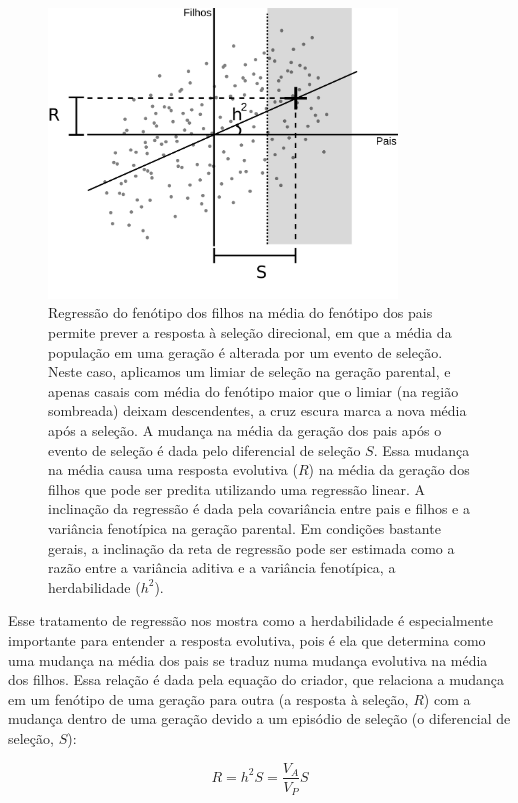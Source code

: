 \begin{refsection}
\begin{figure}
    \centering
    \includegraphics[width=350px]{parent-offspring.png}
    \caption[Regressão pais e filhos]{Regressão do fenótipo dos filhos na média 
    do fenótipo dos pais permite prever a resposta à seleção direcional, em
    que a média da população em uma geração é alterada por um evento de
    seleção. Neste caso, aplicamos um limiar de seleção na geração parental, e
    apenas casais com média do fenótipo maior que o limiar (na região
    sombreada) deixam descendentes, a cruz escura marca a nova média após a
    seleção. A mudança na média da geração dos pais após o evento de seleção é
    dada pelo diferencial de seleção $S$. Essa mudança na média causa uma
    resposta evolutiva ($R$) na média da geração dos filhos que pode ser
    predita utilizando uma regressão linear. A inclinação da regressão é dada
    pela covariância entre pais e filhos e a variância fenotípica na geração
    parental. Em condições bastante gerais, a inclinação da reta de regressão pode ser 
    estimada como a razão entre a variância aditiva e a variância fenotípica, a
    herdabilidade ($h^2$).}
    \label{PoR}
\end{figure}

\enlargethispage{\baselineskip}
Esse tratamento de regressão nos mostra como a herdabilidade é especialmente
importante para entender a resposta evolutiva, pois é ela que determina como
uma mudança na média dos pais se traduz numa mudança evolutiva na média dos
filhos. Essa relação é dada pela equação do criador, que relaciona a mudança
em um fenótipo de uma geração para outra (a resposta à seleção, $R$) com a
mudança dentro de uma geração devido a um episódio de seleção (o diferencial
de seleção, $S$):

\begin{equation}
R = h^2S = \frac{V_A}{V_P}S 
\end{equation}


\end{refsection}
